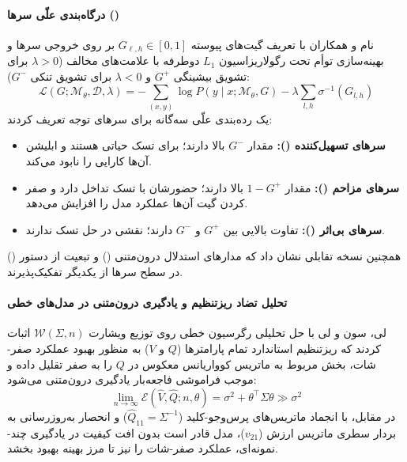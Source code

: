 \paragraph*{درگاه‌بندی علّی سرها ()}
نام و همکاران \cite{nam2025causal} با تعریف گیت‌های پیوسته $G_{\ell,h} \in [0, 1]$ بر روی خروجی سرها و بهینه‌سازی توأم تحت رگولاریزاسیون $L_1$ دوطرفه با علامت‌های مخالف ($\lambda > 0$ برای تشویق بیشینگی $G^+$ و $\lambda < 0$ برای تشویق تنکی $G^-$):
\begin{equation}
    \mathcal{L}(G; \mathcal{M}_\theta, \mathcal{D}, \lambda) = -\sum_{(x,y)} \log P(y \mid x; \mathcal{M}_\theta, G) - \lambda \sum_{l,h} \sigma^{-1}(G_{l,h})
\end{equation}
یک رده‌بندی علّی سه‌گانه برای سرهای توجه تعریف کردند:
\begin{itemize}
    \item \textbf{سرهای تسهیل‌کننده ():} مقدار $G^-$ بالا دارند؛ برای تسک حیاتی هستند و ابلیشن آن‌ها کارایی را نابود می‌کند.
    \item \textbf{سرهای مزاحم ():} مقدار $1 - G^+$ بالا دارند؛ حضورشان با تسک تداخل دارد و صفر کردن گیت آن‌ها عملکرد مدل را افزایش می‌دهد.
    \item \textbf{سرهای بی‌اثر ():} تفاوت بالایی بین $G^+$ و $G^-$ دارند؛ نقشی در حل تسک ندارند.
\end{itemize}
همچنین نسخه تقابلی  نشان داد که مدارهای استدلال درون‌متنی () و تبعیت از دستور () در سطح سرها از یکدیگر تفکیک‌پذیرند.

\paragraph*{تحلیل تضاد ریزتنظیم و یادگیری درون‌متنی در مدل‌های خطی}
لی، سون و لی \cite{lee2026finetuning} با حل تحلیلی رگرسیون خطی روی توزیع ویشارت $\mathcal{W}(\Sigma, n)$ اثبات کردند که ریزتنظیم استاندارد تمام پارامترها ($Q$ و $V$) به منظور بهبود عملکرد صفر-شات، بخش مربوط به ماتریس کوواریانس معکوس در $Q$ را به صفر تقلیل داده و موجب فراموشی فاجعه‌بار یادگیری درون‌متنی می‌شود:
\begin{equation}
    \lim_{n \to \infty} \mathcal{E}(\hat{V}, \hat{Q}; n, \theta) = \sigma^2 + \theta^\top \Sigma \theta \gg \sigma^2
\end{equation}
در مقابل، با انجماد ماتریس‌های پرس‌وجو-کلید ($\hat{Q}_{11} = \Sigma^{-1}$) و انحصار به‌روزرسانی به بردار سطری ماتریس ارزش ($v_{21}$)، مدل قادر است بدون افت کیفیت در یادگیری چند-نمونه‌ای، عملکرد صفر-شات را نیز تا مرز بهینه بهبود بخشد.